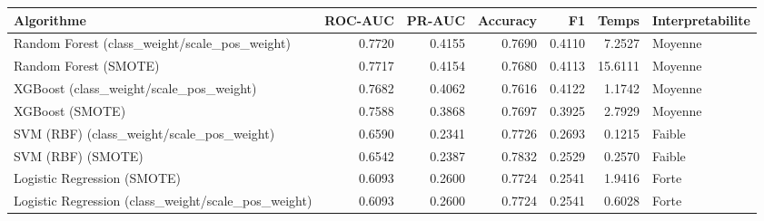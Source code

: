 \begin{tabular}{lrrrrrl}
\toprule
Algorithme & ROC-AUC & PR-AUC & Accuracy & F1 & Temps & Interpretabilite \\
\midrule
Random Forest (class\_weight/scale\_pos\_weight) & 0.7720 & 0.4155 & 0.7690 & 0.4110 & 7.2527 & Moyenne \\
Random Forest (SMOTE) & 0.7717 & 0.4154 & 0.7680 & 0.4113 & 15.6111 & Moyenne \\
XGBoost (class\_weight/scale\_pos\_weight) & 0.7682 & 0.4062 & 0.7616 & 0.4122 & 1.1742 & Moyenne \\
XGBoost (SMOTE) & 0.7588 & 0.3868 & 0.7697 & 0.3925 & 2.7929 & Moyenne \\
SVM (RBF) (class\_weight/scale\_pos\_weight) & 0.6590 & 0.2341 & 0.7726 & 0.2693 & 0.1215 & Faible \\
SVM (RBF) (SMOTE) & 0.6542 & 0.2387 & 0.7832 & 0.2529 & 0.2570 & Faible \\
Logistic Regression (SMOTE) & 0.6093 & 0.2600 & 0.7724 & 0.2541 & 1.9416 & Forte \\
Logistic Regression (class\_weight/scale\_pos\_weight) & 0.6093 & 0.2600 & 0.7724 & 0.2541 & 0.6028 & Forte \\
\bottomrule
\end{tabular}

